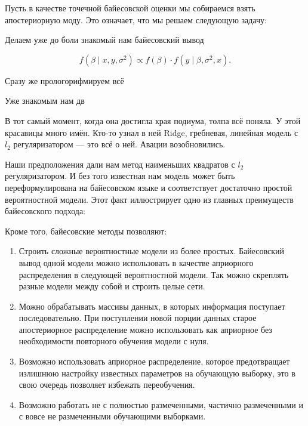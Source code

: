 \documentclass[12pt, a4paper, oneside]{extreport}
\def \b{\beta}
\theoremstyle{plain}              %
\theoremstyle{definition}         %
\begin{document}
Пусть в качестве точечной байесовской оценки мы собираемся взять апостериорную моду. Это означает, что мы решаем следующую задачу: 

Делаем уже до боли знакомый нам байесовский вывод

\[ f(\b \mid x,y, \sigma^2) \propto f(\b) \cdot f(y \mid \b, \sigma^2, x).\]

Сразу же прологорифмируем всё 


Уже знакомым нам дв


В тот самый момент, когда она достигла края подиума, толпа всё поняла. У этой красавицы много имён. Кто-то узнал в ней  Ridge, гребневая, линейная модель с $l_2$ регуляризатором --- это всё о ней. Авации возобновились. 

Наши предположения дали нам метод наименьших квадратов с $l_2$ регуляризатором. И без того известная нам модель может быть переформулирована на байесовском языке и соответствует достаточно простой вероятностной модели. Этот факт иллюстрирует одно из главных преимуществ байесовского подхода: 




Кроме того, байесовские методы позволяют:

\begin{enumerate} 
\item Строить сложные вероятностные модели из более простых. Байесовский вывод одной модели можно использовать в качестве априорного распределения в следующей вероятностной модели. Так можно скреплять разные модели между собой и строить целые сети. 

\item Можно обрабатывать массивы данных, в которых информация поступает последовательно. При поступлении новой порции данных старое апостериорное распределение можно использовать как априорное без необходимости повторного обучения модели с нуля. 

\item Возможно использовать априорное распределение, которое предотвращает излишнюю настройку известных параметров на обучающую выборку, это в свою очередь позволяет избежать переобучения. 

\item Возможно работать не с полностью размеченными, частично размеченными и с вовсе не размеченными обучающими выборками. 

\end{enumerate}


\end{document}

